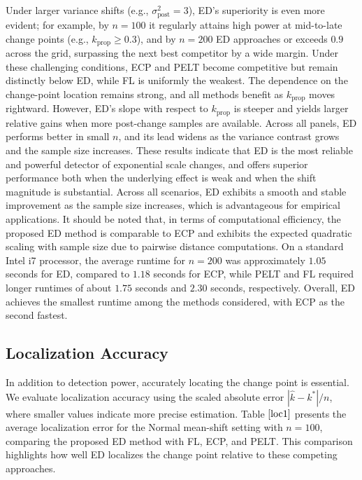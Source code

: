 \documentclass[11pt]{article}
\numberwithin{theorem}{section}
\numberwithin{Lemma}{section}
\numberwithin{Definition}{section}
\begin{document}
Under larger variance shifts (e.g., $\sigma^2_{\text{post}}=3$), ED’s superiority is even more evident; for example, by $n{=}100$ it regularly attains high power at mid-to-late change points (e.g., $k_{\text{prop}}{\ge}0.3$), and by $n{=}200$ ED approaches or exceeds $0.9$ across the grid, surpassing the next best competitor by a wide margin. Under these challenging conditions, ECP and PELT become competitive but remain distinctly below ED, while FL is uniformly the weakest. The dependence on the change-point location remains strong, and all methods benefit as $k_{\text{prop}}$ moves rightward. However, ED’s slope with respect to $k_{\text{prop}}$ is steeper and yields larger relative gains when more post-change samples are available. Across all panels, ED performs better in small $n$, and its lead widens as the variance contrast grows and the sample size increases. These results indicate that ED is the most reliable and powerful detector of exponential scale changes, and offers superior performance both when the underlying effect is weak and when the shift magnitude is substantial. Across all scenarios, ED exhibits a smooth and stable improvement as the sample size increases, which is advantageous for empirical applications. It should be noted that, in terms of computational efficiency, the proposed ED method is comparable to ECP and exhibits the expected quadratic scaling with sample size due to pairwise distance computations. On a standard Intel i7 processor, the average runtime for $n=200$ was approximately $1.05$ seconds for ED, compared to $1.18$ seconds for ECP, while PELT and FL required longer runtimes of about $1.75$ seconds and $2.30$ seconds, respectively. Overall, ED achieves the smallest runtime among the methods considered, with ECP as the second fastest.\\

\subsection{Localization Accuracy}
In addition to detection power, accurately locating the change point is essential. We evaluate localization accuracy using the scaled absolute error $|\hat{k}-k^*|/n$, where smaller values indicate more precise estimation. Table $\ref{loc1}$ presents the average localization error for the Normal mean-shift setting with $n=100$, comparing the proposed ED method with FL, ECP, and PELT. This comparison highlights how well ED localizes the change point relative to these competing approaches.
\end{document}
